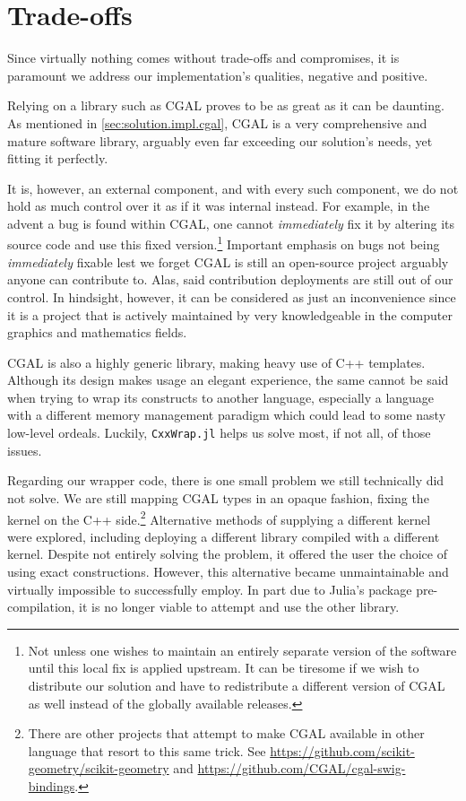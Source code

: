 \section{Trade-offs}%
\label{sec:solution.tradeoffs}

Since virtually nothing comes without trade-offs and compromises, it is
paramount we address our implementation's qualities, negative and positive.

Relying on a library such as \ac{CGAL} proves to be as great as it can be
daunting.  As mentioned in \cref{sec:solution.impl.cgal}, \ac{CGAL} is a very
comprehensive and mature software library, arguably even far exceeding our
solution's needs, yet fitting it perfectly.

It is, however, an external component, and with every such component, we do not
hold as much control over it as if it was internal instead.  For example, in the
advent a bug is found within \ac{CGAL}, one cannot \emph{immediately} fix it by
altering its source code and use this fixed version.\footnote{Not unless one
wishes to maintain an entirely separate version of the software until this local
fix is applied upstream.  It can be tiresome if we wish to distribute our
solution and have to redistribute a different version of \ac{CGAL} as well
instead of the globally available releases.}  Important emphasis on bugs not
being \emph{immediately} fixable lest we forget \ac{CGAL} is still an
open-source project arguably anyone can contribute to.  Alas, said contribution
deployments are still out of our control.  In hindsight, however, it can be
considered as just an inconvenience since it is a project that is actively
maintained by very knowledgeable in the computer graphics and mathematics
fields.

\Ac{CGAL} is also a highly generic library, making heavy use of C++ templates.
Although its design makes usage an elegant experience, the same cannot be said
when trying to wrap its constructs to another language, especially a language
with a different memory management paradigm which could lead to some nasty
low-level ordeals.  Luckily, \texttt{CxxWrap.jl} helps us solve most, if not
all, of those issues.

Regarding our wrapper code,  there is one small problem we still technically did
not solve.  We are still mapping \ac{CGAL} types in an opaque fashion, fixing
the kernel on the C++ side.\footnote{There are other projects that attempt to
make \ac{CGAL} available in other language that resort to this same trick. See
\url{https://github.com/scikit-geometry/scikit-geometry} and
\url{https://github.com/CGAL/cgal-swig-bindings}.}  Alternative methods of
supplying a different kernel were explored, including deploying a different
library compiled with a different kernel.  Despite not entirely solving the
problem, it offered the user the choice of using exact constructions.  However,
this alternative became unmaintainable and virtually impossible to successfully
employ.  In part due to Julia's package pre-compilation, it is no longer viable
to attempt and use the other library.

